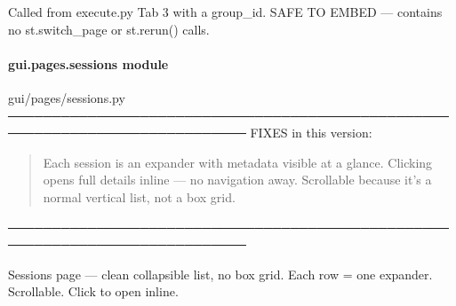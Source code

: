 \documentclass[letterpaper,10pt,english]{sphinxmanual}
\begin{document}

\begin{fulllineitems}
\label{\detokenize{gui.pages.session_analysis:gui.pages.session_analysis.render_session_analysis}}
\pysigstartsignatures
\pysiglinewithargsret
{}
{}
{}
\pysigstopsignatures
\sphinxAtStartPar
Called from execute.py Tab 3 with a group\_id.
SAFE TO EMBED — contains no st.switch\_page or st.rerun() calls.

\end{fulllineitems}


\sphinxstepscope


\paragraph{gui.pages.sessions module}
\label{\detokenize{gui.pages.sessions:module-gui.pages.sessions}}\label{\detokenize{gui.pages.sessions:gui-pages-sessions-module}}\label{\detokenize{gui.pages.sessions::doc}}
\sphinxAtStartPar
gui/pages/sessions.py
─────────────────────────────────────────────────────────────────────────────
FIXES in this version:
\begin{quote}
\begin{description}
\sphinxAtStartPar
Each session is an expander with metadata visible at a glance.
Clicking opens full details inline — no navigation away.
Scrollable because it’s a normal vertical list, not a box grid.

\end{description}
\end{quote}

\sphinxAtStartPar
─────────────────────────────────────────────────────────────────────────────

\begin{fulllineitems}
\label{\detokenize{gui.pages.sessions:gui.pages.sessions.render}}
\pysigstartsignatures
\pysiglinewithargsret
{}
{}
{}
\pysigstopsignatures
\sphinxAtStartPar
Sessions page — clean collapsible list, no box grid.
Each row = one expander. Scrollable. Click to open inline.

\end{fulllineitems}
\end{document}
